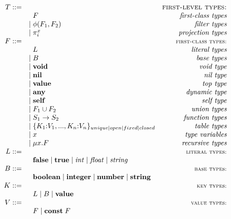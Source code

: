 \documentclass[preprint]{sigplanconf}
\newcommand{\Value}{\mathbf{value}}
\newcommand{\Any}{\mathbf{any}}
\newcommand{\Nil}{\mathbf{nil}}
\newcommand{\Self}{\mathbf{self}}
\newcommand{\False}{\mathbf{false}}
\newcommand{\True}{\mathbf{true}}
\newcommand{\Boolean}{\mathbf{boolean}}
\newcommand{\Integer}{\mathbf{integer}}
\newcommand{\Number}{\mathbf{number}}
\newcommand{\String}{\mathbf{string}}
\newcommand{\Const}{\mathbf{const}}
\begin{document}
\begin{figure*}[t]
$$
\begin{array}{rlr}
T ::= & & \textsc{first-level types:}\\
& \;\; F & \textit{first-class types}\\
& | \; \phi(F_{1},F_{2}) & \textit{filter types}\\
& | \; \pi_{i}^{x} & \textit{projection types}\\
F ::= & & \textsc{{\small first-class types:}}\\
& \;\; L & \textit{literal types}\\
& | \; B & \textit{base types}\\
& | \; \mathbf{void} & \textit{void type}\\
& | \; \Nil & \textit{nil type}\\
& | \; \Value & \textit{top type}\\
& | \; \Any & \textit{dynamic type}\\
& | \; \Self & \textit{self type}\\
& | \; F_{1} \cup F_{2} & \textit{union types}\\
& | \; S_{1} \rightarrow S_{2} & \textit{function types}\\
& | \; \{K_{1}{:}V_{1}, ..., K_{n}{:}V_{n}\}_{unique|open|fixed|closed} & \textit{table types}\\
& | \; x & \textit{type variables}\\
& | \; \mu x.F & \textit{recursive types}\\
L ::= & & \textsc{{\small literal types:}}\\
& \;\; \False \; | \; \True \; | \; {\it int} \; | \; {\it float} \; | \; {\it string} &\\
B ::= & & \textsc{{\small base types:}}\\
& \;\; \Boolean \; | \; \Integer \; | \; \Number \; | \; \String &\\
K ::= & & \textsc{{\small key types:}}\\
& \;\; L \; | \; B \; | \; \Value &\\
V ::= & & \textsc{{\small value types:}}\\
& \;\; F \; | \; \Const \; F &\\ 

\end{array}$$
\end{figure*}
\end{document}
